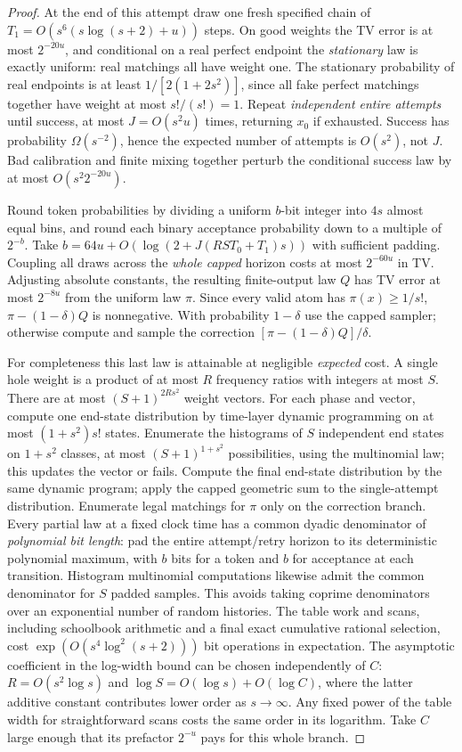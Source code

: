 \begin{proof}
At the end of this attempt draw one fresh specified chain of
$T_1=O(s^6(s\log(s+2)+u))$ steps.  On good weights the TV
error is at most $2^{-20u}$, and conditional on a real perfect endpoint
the \emph{stationary} law is exactly uniform: real matchings all have
weight one. The stationary probability of real endpoints is at least
$1/[2(1+2s^2)]$, since all fake perfect matchings together have weight
at most $s!/(s!)=1$. Repeat \emph{independent entire attempts} until
success, at most $J=O(s^2u)$ times, returning $x_0$ if exhausted.
Success has probability $\Omega(s^{-2})$, hence the expected number of
attempts is $O(s^2)$, not $J$. Bad calibration and finite mixing
together perturb the conditional success law by at most $O(s^2 2^{-20u})$.

Round token probabilities by dividing a uniform $b$-bit integer into
$4s$ almost equal bins, and round each binary acceptance probability down
to a multiple of $2^{-b}$.  Take $b=64u+O(\log(2+J(RST_0+T_1)s))$ with
sufficient padding.  Coupling all draws across the \emph{whole capped}
horizon costs at most $2^{-60u}$ in TV.  Adjusting absolute constants, the
resulting finite-output law $Q$ has TV error at most $2^{-8u}$ from the
uniform law $\pi$. Since every valid atom has $\pi(x)\ge1/s!$,
$\pi-(1-\delta)Q$ is nonnegative.  With probability $1-\delta$ use
the capped sampler; otherwise compute and sample the correction
$[\pi-(1-\delta)Q]/\delta$.

For completeness this last law is attainable at negligible \emph{expected}
cost. A single hole weight is a product of at most $R$ frequency ratios
with integers at most $S$. There are at most $(S+1)^{2Rs^2}$ weight
vectors. For each phase and vector, compute one end-state distribution
by time-layer dynamic programming on at most $(1+s^2)s!$ states.
Enumerate the histograms of $S$ independent end states on $1+s^2$
classes, at most $(S+1)^{1+s^2}$ possibilities, using the multinomial
law; this updates the vector or fails.  Compute the final end-state
distribution by the same dynamic program; apply the capped geometric sum
to the single-attempt distribution.  Enumerate legal matchings for $\pi$
only on the correction branch. Every partial law at a fixed clock time
has a common dyadic denominator of \emph{polynomial bit length}: pad
the entire attempt/retry horizon to its deterministic polynomial maximum,
with $b$ bits for a token and $b$ for acceptance at each transition.
Histogram multinomial computations likewise admit the common denominator
for $S$ padded samples.  This avoids taking coprime denominators over an
exponential number of random histories. The table work and scans, including
schoolbook arithmetic and a final exact cumulative rational selection, cost
$\exp(O(s^4\log^2(s+2)))$ bit operations in expectation. The asymptotic
coefficient in the log-width bound can be chosen independently of $C$:
$R=O(s^2\log s)$ and $\log S=O(\log s)+O(\log C)$, where the
latter additive constant contributes lower order as $s\to\infty$.
Any fixed power of the table width for straightforward scans costs the
same order in its logarithm. Take $C$ large enough that its prefactor
$2^{-u}$ pays for this whole branch.


\end{proof}
